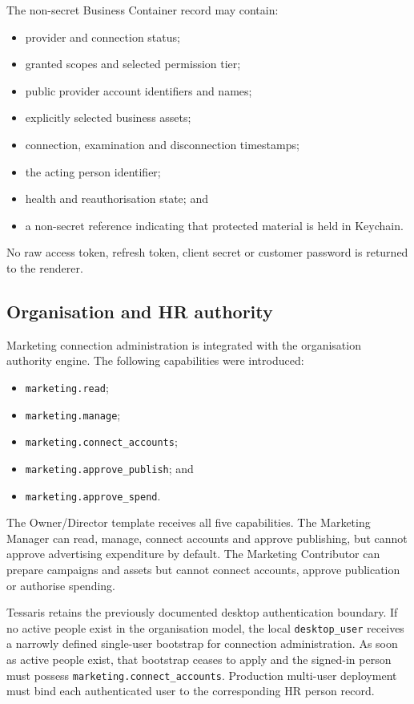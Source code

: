 The non-secret Business Container record may contain:

\begin{itemize}
    \item provider and connection status;
    \item granted scopes and selected permission tier;
    \item public provider account identifiers and names;
    \item explicitly selected business assets;
    \item connection, examination and disconnection timestamps;
    \item the acting person identifier;
    \item health and reauthorisation state; and
    \item a non-secret reference indicating that protected material is held in Keychain.
\end{itemize}

No raw access token, refresh token, client secret or customer password is returned to the renderer.

\subsection{Organisation and HR authority}

Marketing connection administration is integrated with the organisation authority engine. The following capabilities were introduced:

\begin{itemize}
    \item \texttt{marketing.read};
    \item \texttt{marketing.manage};
    \item \texttt{marketing.connect\_accounts};
    \item \texttt{marketing.approve\_publish}; and
    \item \texttt{marketing.approve\_spend}.
\end{itemize}

The Owner/Director template receives all five capabilities. The Marketing Manager can read, manage, connect accounts and approve publishing, but cannot approve advertising expenditure by default. The Marketing Contributor can prepare campaigns and assets but cannot connect accounts, approve publication or authorise spending.

Tessaris retains the previously documented desktop authentication boundary. If no active people exist in the organisation model, the local \texttt{desktop\_user} receives a narrowly defined single-user bootstrap for connection administration. As soon as active people exist, that bootstrap ceases to apply and the signed-in person must possess \texttt{marketing.connect\_accounts}. Production multi-user deployment must bind each authenticated user to the corresponding HR person record.

